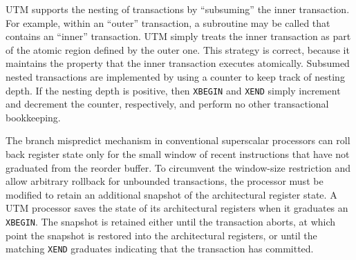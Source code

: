 UTM supports the nesting of transactions by ``subsuming'' the inner
transaction.  For example, within an ``outer'' transaction, a
subroutine may be called that contains an ``inner'' transaction.
UTM simply treats the inner transaction as part of the atomic
region defined by the outer one.  This strategy is correct, because it
maintains the property that the inner transaction executes atomically.
Subsumed nested transactions are implemented by using a counter to
keep track of nesting depth.  If the nesting depth is positive, then
\texttt{XBEGIN} and \texttt{XEND} simply increment and decrement the
counter, respectively, and perform no other transactional bookkeeping.


The branch mispredict mechanism in conventional superscalar processors
can roll back register state only for the small window of recent
instructions that have not graduated from the reorder buffer.  To
circumvent the window-size restriction and allow arbitrary rollback
for unbounded transactions, the processor must be modified to retain
an additional snapshot of the architectural register state.  A UTM
processor saves the state of its architectural registers when it
graduates an \texttt{XBEGIN}\@.  The snapshot is retained either until
the transaction aborts, at which point the snapshot is restored into
the architectural registers, or until the matching \texttt{XEND}
graduates indicating that the transaction has committed.

